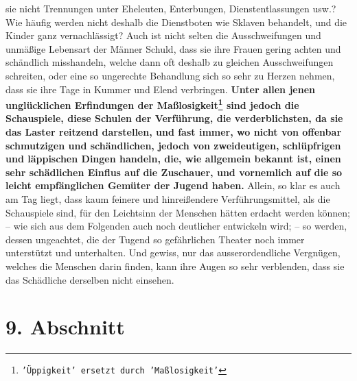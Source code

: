 sie nicht Trennungen unter Eheleuten, Enterbungen, Dienstentlassungen usw.?
Wie häufig werden nicht deshalb die Dienstboten
wie
Sklaven behandelt, und die
Kinder ganz vernachlässigt? Auch ist nicht selten die
Ausschweifungen und
unmäßige Lebensart der Männer Schuld,
dass sie ihre Frauen gering achten und
schändlich misshandeln, welche dann oft deshalb zu gleichen Ausschweifungen
schreiten, oder eine so ungerechte Behandlung sich so sehr zu Herzen nehmen,
dass
sie ihre Tage in Kummer und Elend verbringen.
\label{ref:15_08_schauspiel}
\textbf{Unter allen jenen unglücklichen
Erfindungen der Maßlosigkeit\footnote{\texttt{'Üppigkeit' ersetzt durch
'Maßlosigkeit'}}
sind jedoch die Schauspiele, diese Schulen der
Verführung, die verderblichsten, da sie das Laster reitzend darstellen, und fast
immer, wo nicht von offenbar schmutzigen und schändlichen, jedoch von
zweideutigen, schlüpfrigen und läppischen Dingen handeln, die, wie allgemein
bekannt ist, einen sehr schädlichen Einflus auf die Zuschauer, und vornemlich
auf die so leicht empfänglichen Gemüter der Jugend haben.} Allein, so klar es
auch am Tag liegt, dass kaum feinere und hinreißendere Verführungsmittel, als
die Schauspiele sind, für den Leichtsinn der Menschen hätten erdacht werden
können; -- wie sich aus dem Folgenden auch noch deutlicher entwickeln wird; --
so werden, dessen ungeachtet, die der Tugend so gefährlichen Theater noch immer
unterstützt und unterhalten. Und gewiss, nur das ausserordendliche Vergnügen,
welches die Menschen darin finden, kann ihre Augen so sehr verblenden, dass sie
das Schädliche derselben nicht einsehen.

\section{9. Abschnitt} \label{kap15_ab9}


